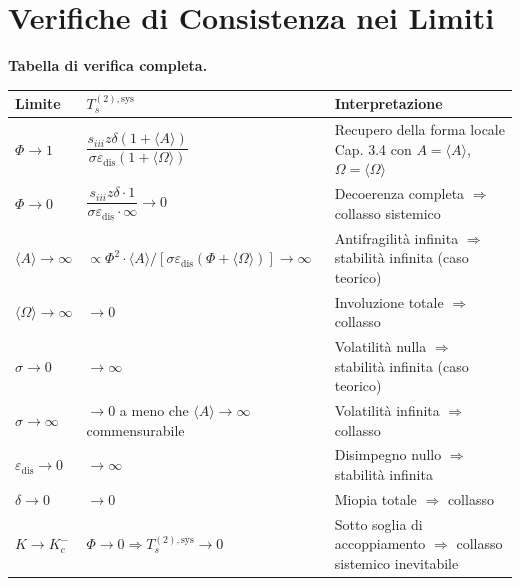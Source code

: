 \section{Verifiche di Consistenza nei
Limiti}\label{verifiche-di-consistenza-nei-limiti}

\Proved{} \textbf{Tabella di verifica completa.}

{\def\LTcaptype{none} %
{\small\begin{longtable}[]{@{}
  >{\raggedright\arraybackslash}p{}
  >{\raggedright\arraybackslash}p{}
  >{\raggedright\arraybackslash}p{}@{}}
\toprule\noalign{}
\begin{minipage}[b]{\linewidth}\raggedright
Limite
\end{minipage} & \begin{minipage}[b]{\linewidth}\raggedright
\(T_s^{(2),\text{sys}}\)
\end{minipage} & \begin{minipage}[b]{\linewidth}\raggedright
Interpretazione
\end{minipage} \\
\midrule\noalign{}
\endhead
\bottomrule\noalign{}
\endlastfoot
\(\Phi \to 1\) &
\(\dfrac{s_{iii}z\delta(1+\langle A\rangle)}{\sigma\varepsilon_{\text{dis}}(1+\langle\Omega\rangle)}\)
& Recupero della forma locale Cap. 3.4 con \(A=\langle A\rangle\),
\(\Omega=\langle\Omega\rangle\) \Proved{} \\
\(\Phi \to 0\) &
\(\dfrac{s_{iii}z\delta \cdot 1}{\sigma\varepsilon_{\text{dis}} \cdot \infty} \to 0\)
& Decoerenza completa \(\Rightarrow\) collasso sistemico \Proved{} \\
\(\langle A\rangle \to \infty\) &
\(\propto \Phi^2 \cdot \langle A\rangle / [\sigma\varepsilon_{\text{dis}}(\Phi+\langle\Omega\rangle)] \to \infty\)
& Antifragilità infinita \(\Rightarrow\) stabilità infinita (caso
teorico) \Proved{} \\
\(\langle\Omega\rangle \to \infty\) & \(\to 0\) & Involuzione totale
\(\Rightarrow\) collasso \Proved{} \\
\(\sigma \to 0\) & \(\to \infty\) & Volatilità nulla \(\Rightarrow\)
stabilità infinita (caso teorico) \Proved{} \\
\(\sigma \to \infty\) & \(\to 0\) a meno che
\(\langle A\rangle \to \infty\) commensurabile & Volatilità infinita
\(\Rightarrow\) collasso \Proved{} \\
\(\varepsilon_{\text{dis}} \to 0\) & \(\to \infty\) & Disimpegno nullo
\(\Rightarrow\) stabilità infinita \Proved{} \\
\(\delta \to 0\) & \(\to 0\) & Miopia totale \(\Rightarrow\) collasso
\Proved{} \\
\(K \to K_c^-\) & \(\Phi \to 0 \Rightarrow T_s^{(2),\text{sys}} \to 0\)
& Sotto soglia di accoppiamento \(\Rightarrow\) collasso sistemico
inevitabile \Proved{} \\
\end{longtable}}
}

